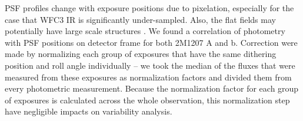 \documentclass[12pt]{article}
\begin{document}
PSF profiles change with exposure positions due to
pixelation, especially for the case that WFC3 IR is significantly
under-sampled. Also, the flat fields may potentially have large scale
structures \citep{dressel2012wide}. We found a correlation of
photometry with PSF positions on detector frame for both 2M1207 A and
b. Correction were made by normalizing each group of
exposures that have the same dithering position and roll angle
individually -- we took the median of the fluxes that were measured
from these exposures as normalization factors and divided them from
every photometric measurement. Because the normalization factor for
each group of exposures is calculated across the whole observation,
this normalization step have negligible impacts on variability
analysis.








\end{document}
